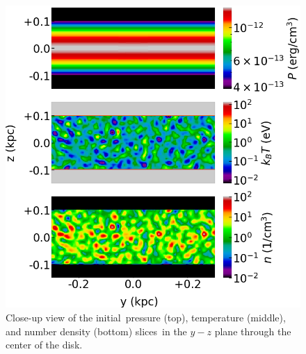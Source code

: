 \documentclass[fleqn,usenatbib,useAMS]{mnras}
\begin{document}
  \begin{figure}
    \includegraphics[width=\columnwidth]{figures/fig__zoom-in-disc.png}
    \caption{Close-up view of the initial\
             pressure (top), temperature (middle), and number density (bottom) slices\
             in the $y-z$ plane through the center of the disk.
             }
    \label{fig__zoom-in-disc}
  \end{figure}
\end{document}

